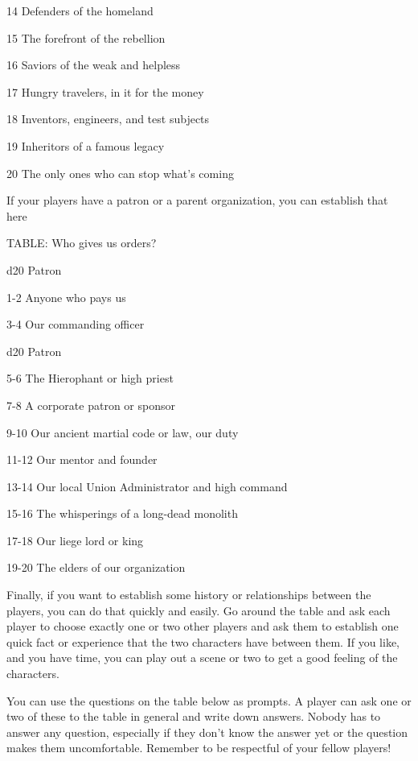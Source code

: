   14       Defenders of the homeland 

  15       The forefront of the rebellion 

  16       Saviors of the weak and helpless 

  17       Hungry travelers, in it for the money 

  18       Inventors, engineers, and test subjects 

  19       Inheritors of a famous legacy 

  20       The only ones who can stop what’s coming 

If your players have a patron or a parent organization, you can establish that here
 

TABLE: Who gives us orders?
 

 d20       Patron 

 1-2       Anyone who pays us 

 3-4       Our commanding officer 

                                                                                                              


 d20       Patron 

 5-6       The Hierophant or high priest 

 7-8       A corporate patron or sponsor 

 9-10      Our ancient martial code or law, our duty 

 11-12     Our mentor and founder 

 13-14     Our local Union Administrator and high command 

 15-16     The whisperings of a long-dead monolith 

 17-18     Our liege lord or king 

 19-20     The elders of our organization 

Finally, if you want to establish some history or relationships between the players, you can do  
that quickly and easily. Go around the table and ask each player to choose exactly one or two  
other players and ask them to establish one quick fact or experience that the two characters  
have between them. If you like, and you have time, you can play out a scene or two to get a  
good feeling of the characters.
 

You can use the questions on the table below as prompts. A player can ask one or two of these  
to the table in general and write down answers. Nobody has to answer any question, especially if  
they don’t know the answer yet or the question makes them uncomfortable. Remember to be  
respectful of your fellow players!
 

